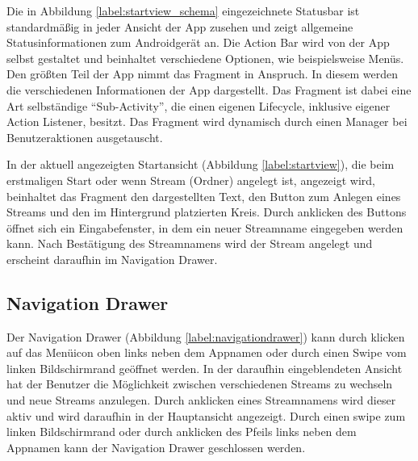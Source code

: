 Die in Abbildung \ref{label:startview_schema} eingezeichnete Statusbar ist standardmäßig in jeder Ansicht der App zusehen und zeigt allgemeine Statusinformationen zum Androidgerät an. Die Action Bar wird von der App selbst gestaltet und beinhaltet verschiedene Optionen, wie beispielsweise Menüs. Den größten Teil der App nimmt das Fragment in Anspruch. In diesem werden die verschiedenen Informationen der App dargestellt. Das Fragment ist dabei eine Art selbständige \enquote{Sub-Activity}, die einen eigenen Lifecycle, inklusive eigener Action Listener, besitzt.
Das Fragment wird dynamisch durch einen Manager bei Benutzeraktionen ausgetauscht.

In der aktuell angezeigten Startansicht (Abbildung \ref{label:startview}), die beim erstmaligen Start oder wenn Stream (Ordner) angelegt ist, angezeigt wird, beinhaltet das Fragment den dargestellten Text, den Button zum Anlegen eines Streams und den im Hintergrund platzierten Kreis. Durch anklicken des Buttons öffnet sich ein Eingabefenster, in dem ein neuer Streamname eingegeben werden kann. Nach Bestätigung des Streamnamens wird der Stream angelegt und erscheint daraufhin im Navigation Drawer. 

\subsection{Navigation Drawer}

Der Navigation Drawer (Abbildung \ref{label:navigationdrawer}) kann durch klicken auf das Menüicon oben links neben dem Appnamen oder durch einen Swipe vom linken Bildschirmrand geöffnet werden.
In der daraufhin eingeblendeten Ansicht hat der Benutzer die Möglichkeit zwischen verschiedenen Streams zu wechseln und neue Streams anzulegen. Durch anklicken eines Streamnamens wird dieser aktiv und wird daraufhin in der Hauptansicht angezeigt. Durch einen swipe zum linken Bildschirmrand oder durch anklicken des Pfeils links neben dem Appnamen kann der Navigation Drawer geschlossen werden.

